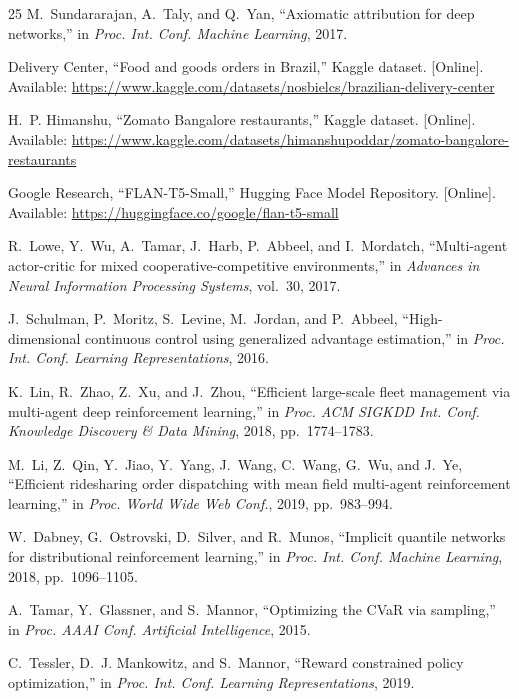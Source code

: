 \documentclass[conference]{IEEEtran}
\begin{document}
\begin{thebibliography}{25}
M.~Sundararajan, A.~Taly, and Q.~Yan, ``Axiomatic attribution for deep networks,'' in \emph{Proc. Int. Conf. Machine Learning}, 2017.

Delivery Center, ``Food and goods orders in Brazil,'' Kaggle dataset. [Online]. Available: \url{https://www.kaggle.com/datasets/nosbielcs/brazilian-delivery-center}

H.~P. Himanshu, ``Zomato Bangalore restaurants,'' Kaggle dataset. [Online]. Available: \url{https://www.kaggle.com/datasets/himanshupoddar/zomato-bangalore-restaurants}

Google Research, ``FLAN-T5-Small,'' Hugging Face Model Repository. [Online]. Available: \url{https://huggingface.co/google/flan-t5-small}

R.~Lowe, Y.~Wu, A.~Tamar, J.~Harb, P.~Abbeel, and I.~Mordatch, ``Multi-agent actor-critic for mixed cooperative-competitive environments,'' in \emph{Advances in Neural Information Processing Systems}, vol.~30, 2017.

J.~Schulman, P.~Moritz, S.~Levine, M.~Jordan, and P.~Abbeel, ``High-dimensional continuous control using generalized advantage estimation,'' in \emph{Proc. Int. Conf. Learning Representations}, 2016.

K.~Lin, R.~Zhao, Z.~Xu, and J.~Zhou, ``Efficient large-scale fleet management via multi-agent deep reinforcement learning,'' in \emph{Proc. ACM SIGKDD Int. Conf. Knowledge Discovery \& Data Mining}, 2018, pp.~1774--1783.

M.~Li, Z.~Qin, Y.~Jiao, Y.~Yang, J.~Wang, C.~Wang, G.~Wu, and J.~Ye, ``Efficient ridesharing order dispatching with mean field multi-agent reinforcement learning,'' in \emph{Proc. World Wide Web Conf.}, 2019, pp.~983--994.

W.~Dabney, G.~Ostrovski, D.~Silver, and R.~Munos, ``Implicit quantile networks for distributional reinforcement learning,'' in \emph{Proc. Int. Conf. Machine Learning}, 2018, pp.~1096--1105.

A.~Tamar, Y.~Glassner, and S.~Mannor, ``Optimizing the CVaR via sampling,'' in \emph{Proc. AAAI Conf. Artificial Intelligence}, 2015.

C.~Tessler, D.~J. Mankowitz, and S.~Mannor, ``Reward constrained policy optimization,'' in \emph{Proc. Int. Conf. Learning Representations}, 2019.


\end{thebibliography}
\end{document}
